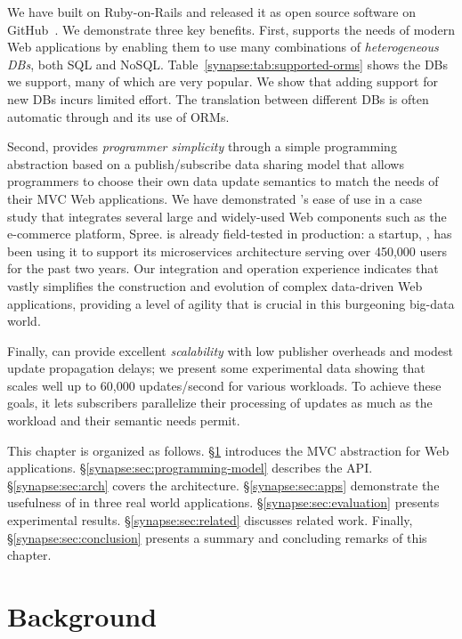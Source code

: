 We have built \synapse on Ruby-on-Rails and released it as open source software
 on GitHub~\cite{synapse-sources}. We demonstrate three
key benefits.  First, \synapse supports the needs of modern Web
applications by enabling them to use many combinations of
\emph{heterogeneous DBs}, both SQL and NoSQL. Table~\ref{synapse:tab:supported-orms}
shows the DBs we support, many of which are very popular.
We show that adding support for new DBs incurs limited effort.  The translation
between different DBs is often automatic through \synapse and its use of ORMs.

Second, \synapse provides
\emph{programmer simplicity} through a simple programming abstraction
based on a publish/subscribe data sharing model that allows programmers to choose their own data update semantics to match the needs of their MVC Web applications.
We have demonstrated \synapse's ease of use in a case study that integrates several large and widely-used Web components such as
the e-commerce platform, Spree.
\synapse is already field-tested in production: a startup, \crowdtap, has been using it to support its microservices architecture serving over 450,000 users for the past two years.
Our integration and operation experience indicates that \synapse vastly
simplifies the construction and evolution of complex data-driven Web
applications, providing a level of agility that is crucial in this
burgeoning big-data world.

Finally, \synapse can provide excellent \emph{scalability} with low publisher
overheads and modest update propagation delays; we present some experimental
data showing that \synapse scales well up to 60,000 updates/second for various
workloads.  To achieve these goals, it lets subscribers parallelize their
processing of updates as much as the workload and their semantic needs
permit.

This chapter is organized as follows.
\S\ref{synapse:sec:motivation} introduces the MVC abstraction for Web applications.
\S\ref{synapse:sec:programming-model} describes the \synapse API.
\S\ref{synapse:sec:arch} covers the \synapse architecture.
\S\ref{synapse:sec:apps} demonstrate the usefulness of \synapse in three real world applications.
\S\ref{synapse:sec:evaluation} presents experimental results.
\S\ref{synapse:sec:related} discusses related work.
Finally, \S\ref{synapse:sec:conclusion} presents a summary and concluding remarks of this chapter.

\section{Background}
\label{synapse:sec:motivation}

